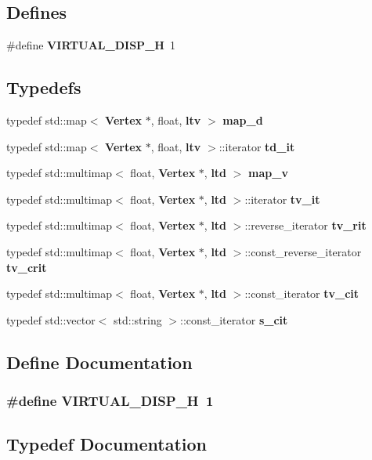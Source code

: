 \subsection*{Defines}
\begin{CompactItemize}
\item 
\#define {\bf VIRTUAL\_\-DISP\_\-H}~1
\end{CompactItemize}
\subsection*{Typedefs}
\begin{CompactItemize}
\item 
typedef std::map$<$ {\bf Vertex} $\ast$, float, {\bf ltv} $>$ {\bf map\_\-d}
\item 
typedef std::map$<$ {\bf Vertex} $\ast$, float, {\bf ltv} $>$::iterator {\bf td\_\-it}
\item 
typedef std::multimap$<$ float, {\bf Vertex} $\ast$, {\bf ltd} $>$ {\bf map\_\-v}
\item 
typedef std::multimap$<$ float, {\bf Vertex} $\ast$, {\bf ltd} $>$::iterator {\bf tv\_\-it}
\item 
typedef std::multimap$<$ float, {\bf Vertex} $\ast$, {\bf ltd} $>$::reverse\_\-iterator {\bf tv\_\-rit}
\item 
typedef std::multimap$<$ float, {\bf Vertex} $\ast$, {\bf ltd} $>$::const\_\-reverse\_\-iterator {\bf tv\_\-crit}
\item 
typedef std::multimap$<$ float, {\bf Vertex} $\ast$, {\bf ltd} $>$::const\_\-iterator {\bf tv\_\-cit}
\item 
typedef std::vector$<$ std::string $>$::const\_\-iterator {\bf s\_\-cit}
\end{CompactItemize}


\subsection{Define Documentation}
\subsubsection{\setlength{\rightskip}{0pt plus 5cm}\#define VIRTUAL\_\-DISP\_\-H~1}\label{virtual__disp_8h_d575e78b4222fac3375391e355c33f5c}




\subsection{Typedef Documentation}
